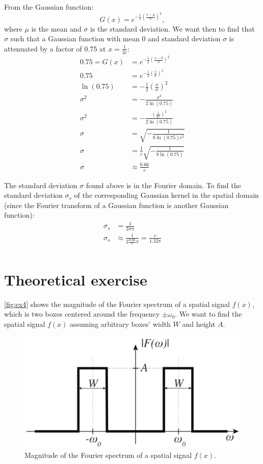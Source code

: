 \documentclass[tikz,14pt,fleqn]{article}
\begin{document}
From the Gaussian function:
\begin{equation*}
    G(x) = e^{-\frac12(\frac{x-\mu}{\sigma})^2},
\end{equation*}where $\mu$ is the mean and $\sigma$ is the standard deviation. 
We want then to find that $\sigma$ such that a Gaussian function with mean 0 and standard deviation $\sigma$ is attenuated by a factor of 0.75 at $x = \frac{1}{2c}$:
\begin{align*}
    0.75 = G(x) &= e^{-\frac12(\frac{x-0}{\sigma})^2} \\
    0.75 &= e^{-\frac12(\frac{x}{\sigma})^2} \\
    \ln(0.75) &= -\frac12(\frac{x}{\sigma})^2 \\
    \sigma^2 &= -\frac{x^2}{2\ln(0.75)} \\
    \sigma^2 &= -\frac{(\frac{1}{2c})^2}{2\ln(0.75)} \\
    \sigma &= \sqrt{-\frac{1}{8\ln(0.75)c^2}} \\
    \sigma &= \frac{1}{c}\sqrt{-\frac{1}{8\ln(0.75)}}\\
    \sigma &\approx \frac{0.66}{c}
\end{align*}

The standard deviation $\sigma$ found above is in the Fourier domain. To find the standard deviation $\sigma_s$ of the corresponding Gaussian kernel in the spatial domain (since the Fourier transform of a Gaussian function is another Gaussian function):
\begin{align*}
    \sigma_s&=\frac{1}{2\sigma \pi} \\
    \sigma_s&\approx\frac{1}{2\frac{0.66}{c} \pi} = \frac{c}{1.32\pi} \\
\end{align*}





\section{Theoretical exercise}
\autoref{fig:ex4} shows the magnitude of the Fourier spectrum of a spatial signal $f(x)$, which is two boxes centered around the frequency $±\omega_0$. We want to find the spatial signal $f(x)$ assuming arbitrary boxes' width $W$ and height $A$.

\begin{figure}[H]
    \centering
    \includegraphics[width=0.4\linewidth]{fig/4.plot.png}
    \caption{Magnitude of the Fourier spectrum of a spatial signal $f(x)$.}
    \label{fig:ex4}
\end{figure}
\end{document}

